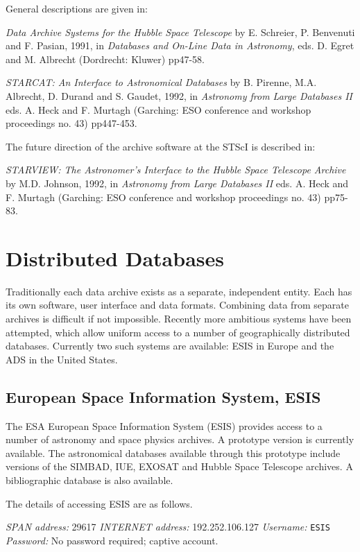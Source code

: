 \documentclass[twoside,11pt,nolof]{starlink}
\begin{document}
General descriptions are given in:

\textit{Data Archive Systems for the Hubble Space Telescope} by E.
Schreier, P. Benvenuti and F. Pasian, 1991, in \textit{Databases and
On-Line Data in Astronomy}, eds. D. Egret and M. Albrecht (Dordrecht:
Kluwer) pp47-58.

\textit{STARCAT: An Interface to Astronomical Databases} by B. Pirenne,
M.A. Albrecht, D. Durand and S. Gaudet, 1992, in \textit{Astronomy from
Large Databases II} eds. A. Heck and F. Murtagh (Garching: ESO
conference and workshop proceedings no. 43) pp447-453.

The future direction of the archive software at the STScI is described
in:

\textit{STARVIEW: The Astronomer's Interface to the Hubble Space Telescope
Archive} by M.D. Johnson, 1992, in \textit{Astronomy from Large Databases
II} eds. A. Heck and F. Murtagh (Garching: ESO conference and workshop
proceedings no. 43) pp75-83.


\section{Distributed Databases}

Traditionally each data archive exists as a separate, independent
entity. Each has its own software, user interface and data formats.
Combining data from separate archives is difficult if not impossible.
Recently more ambitious systems have been attempted, which allow
uniform access to a number of geographically distributed databases.
Currently two such systems are available: ESIS in Europe and the ADS
in the United States.

\subsection{European Space Information System, ESIS
}

The ESA European Space Information System (ESIS) provides access to a
number of astronomy and space physics archives. A prototype version
is currently available. The astronomical databases available through
this prototype include versions of the SIMBAD, IUE, EXOSAT and Hubble
Space Telescope archives. A bibliographic database is also available.

The details of accessing ESIS are as follows.

\textit{SPAN address: } 29617
\newline \textit{INTERNET address:} 192.252.106.127
\newline \textit{Username:} \verb-ESIS-
\newline \textit{Password:} No password required; captive account.
\end{document}
